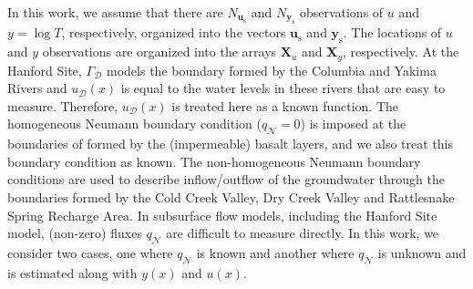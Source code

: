 \documentclass{agujournal2019}
\begin{document}
In this work, we assume that there are $N_{\mathbf{u}_{\mathrm{s}}}$ and $N_{\mathbf{y}_{\mathrm{s}}}$ observations of $u$ and $y = \log T$, respectively, organized into the vectors $\mathbf{u}_{\mathrm{s}}$ and $\mathbf{y}_{\mathrm{s}}$.
The locations of $u$ and $y$ observations are organized into the arrays $\mathbf{X}_u$ and $\mathbf{X}_y$, respectively.
At the Hanford Site, $\Gamma_\mathcal{D}$ models the boundary formed by the Columbia and Yakima Rivers and $u_\mathcal{D}(x)$ is equal to the water levels in these  rivers that are easy to measure. Therefore, $u_\mathcal{D}(x)$ is treated here as a known function.
The homogeneous Neumann boundary condition ($q_\mathcal{N}=0$) is imposed at the boundaries of formed by the (impermeable) basalt layers, and we also treat this boundary condition as known.
The non-homogeneous Neumann boundary conditions are used to describe inflow/outflow of the groundwater through the boundaries formed by the Cold Creek Valley, Dry Creek Valley and Rattlesnake Spring Recharge Area. In subsurface flow models, including the Hanford Site model, (non-zero) fluxes $q_\mathcal{N}$ are difficult to measure directly.
In this work, we consider two cases, one where $q_\mathcal{N}$ is known and another where $q_\mathcal{N}$ is unknown and is estimated along with $y(x)$ and $u(x)$.
\end{document}
